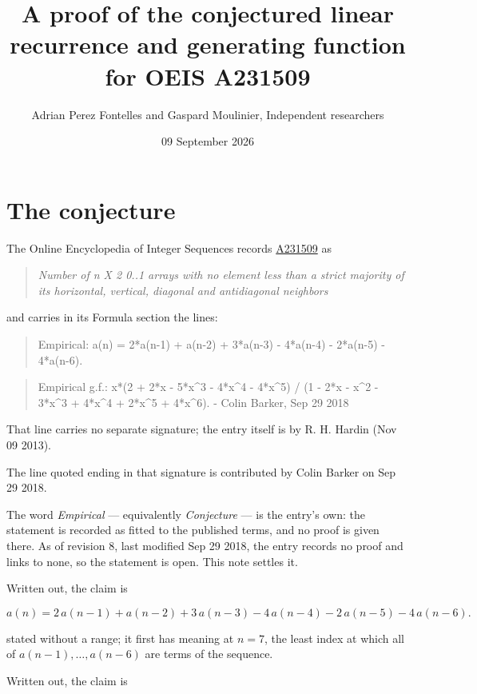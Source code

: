 \documentclass[11pt]{article}
\title{A proof of the conjectured linear recurrence and generating function for OEIS A231509}
\author{Adrian Perez Fontelles and Gaspard Moulinier, Independent researchers}
\date{09 September 2026}
\theoremstyle{definition}
\begin{document}
\maketitle
\section{The conjecture}

The Online Encyclopedia of Integer Sequences records \href{https://oeis.org/A231509}{A231509} as

\begin{quote}\itshape Number of n X 2 0..1 arrays with no element less than a strict majority of its horizontal, vertical, diagonal and antidiagonal neighbors\end{quote}

and carries in its Formula section the lines:

\begin{quote}\ttfamily Empirical: a(n) = 2*a(n-1) + a(n-2) + 3*a(n-3) - 4*a(n-4) - 2*a(n-5) - 4*a(n-6).\end{quote}

\begin{quote}\ttfamily Empirical g.f.: x*(2 + 2*x - 5*x\textasciicircum{}3 - 4*x\textasciicircum{}4 - 4*x\textasciicircum{}5) / (1 - 2*x - x\textasciicircum{}2 - 3*x\textasciicircum{}3 + 4*x\textasciicircum{}4 + 2*x\textasciicircum{}5 + 4*x\textasciicircum{}6). - Colin Barker, Sep 29 2018\end{quote}

That line carries no separate signature; the entry itself is by R. H. Hardin (Nov 09 2013).

The line quoted ending in that signature is contributed by Colin Barker on Sep 29 2018.

The word {\itshape Empirical} --- equivalently {\itshape Conjecture} --- is the entry's own: the statement is recorded as fitted to the published terms, and no proof is given there. As of revision 8, last modified Sep 29 2018, the entry records no proof and links to none, so the statement is open. This note settles it.

Written out, the claim is

\[a(n) = 2\,a(n-1) + a(n-2) + 3\,a(n-3) - 4\,a(n-4) - 2\,a(n-5) - 4\,a(n-6).\]

stated without a range; it first has meaning at $n = 7$, the least index at which all of $a(n-1),\dots,a(n-6)$ are terms of the sequence.

Written out, the claim is
\end{document}
